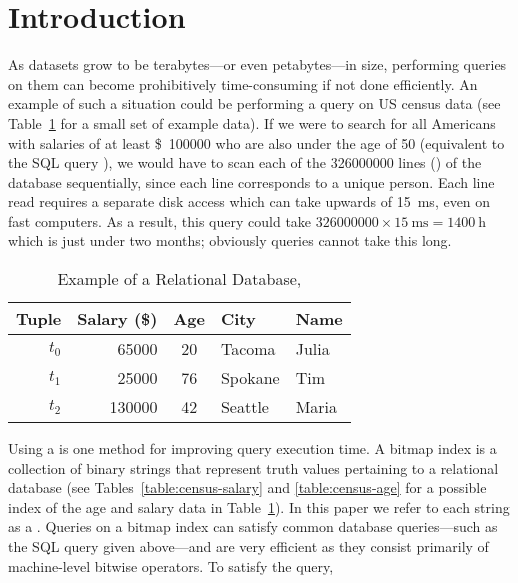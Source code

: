 \section{Introduction}
As datasets grow to be terabytes---or even petabytes---in size, performing
queries on them can become prohibitively time-consuming if not done
efficiently. An example of such a situation could be performing a query on US
census data (see Table~\ref{table:census-relational} for a small set of example
data). If we were to search for all Americans with salaries of at least
\SI{100000}[\$]{} who are also under the age of 50 (equivalent to the SQL query
), we would have to scan each
of the \num{326000000} lines () of the database sequentially, since each line corresponds
to a unique person. Each line read requires a separate disk access which can take upwards of \SI{15}{\milli\second},
even on fast computers. As a result, this query could take
\(\num{326 000 000} \times \SI{15}{\milli\second} = \SI{1400}{\hour}\)
which is just under two months; obviously queries cannot take this long.
\begin{table}[H]
    \centering
    \caption{Example of a Relational Database, }
    \label{table:census-relational}
    \begin{tabular}{@{}r||rcll@{}}
        \toprule
        Tuple   & Salary (\$)  & Age & City    & Name  \\
        \midrule
        \(t_0\) & \num{65000}  & 20  & Tacoma  & Julia \\
        \(t_1\) & \num{25000}  & 76  & Spokane & Tim   \\
        \(t_2\) & \num{130000} & 42  & Seattle & Maria \\
        \bottomrule
    \end{tabular}
\end{table}
\par
Using a  is one method for improving query execution time. A
bitmap index is a collection of binary strings that represent truth values
pertaining to a relational database (see Tables~\ref{table:census-salary} and
\ref{table:census-age} for a possible index of the age and salary data in
Table~\ref{table:census-relational}).  In this paper we refer to each string as
a . Queries on a bitmap index can satisfy common
database queries---such as the SQL query given above---and are very efficient
as they consist primarily of machine-level bitwise operators. To satisfy the query,
